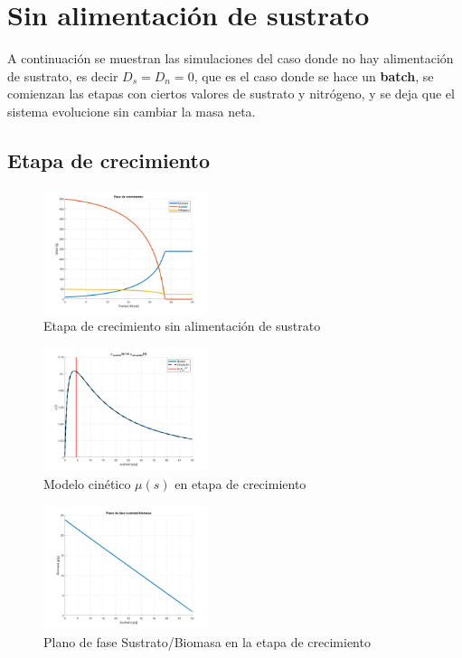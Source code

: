 \documentclass[letterpaper, 10 pt, conference]{ieeeconf}  %
\begin{document}
\section{Sin alimentación de sustrato}

A continuación se muestran las simulaciones del caso donde no hay alimentación de sustrato, es decir $D_{s}=D_{n}=0$, que es el caso donde se hace un \textbf{batch}, se comienzan las etapas con ciertos valores de sustrato y nitrógeno, y se deja que el sistema evolucione sin cambiar la masa neta.

\subsection{Etapa de crecimiento}

\begin{figure}[H]
  \centering
  \includegraphics[width=0.43\textwidth]{./Images_tp1/D0_crecimiento_completo.png}
  \caption{Etapa de crecimiento sin alimentación de sustrato}
  \label{fig:D0_whole}
\end{figure}

\begin{figure}[H]
  \centering
  \includegraphics[width=0.43\textwidth]{./Images_tp1/D0_mus.png}
  \caption{Modelo cinético $\mu(s)$ en etapa de crecimiento}
  \label{fig:D0_mu}
\end{figure}

\begin{figure}[H]
  \centering
  \includegraphics[width=0.43\textwidth]{./Images_tp1/D0_plano_fase.png}
  \caption{Plano de fase Sustrato/Biomasa en la etapa de crecimiento}
  \label{fig:D0_fase}
\end{figure}
\end{document}
